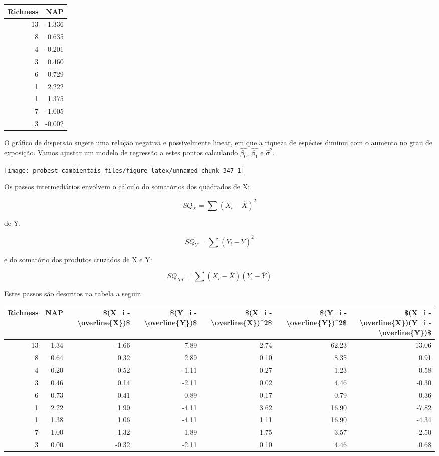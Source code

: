 \documentclass[
]{book}
\begin{document}
\begin{tabular}{r|r}
\hline
Richness & NAP\\
\hline
13 & -1.336\\
\hline
8 & 0.635\\
\hline
4 & -0.201\\
\hline
3 & 0.460\\
\hline
6 & 0.729\\
\hline
1 & 2.222\\
\hline
1 & 1.375\\
\hline
7 & -1.005\\
\hline
3 & -0.002\\
\hline
\end{tabular}

O gráfico de dispersão sugere uma relação negativa e possivelmente linear, em que a riqueza de espécies diminui com o aumento no grau de exposição. Vamos ajustar um modelo de regressão a estes pontos calculando \(\hat{\beta_0}\), \(\hat{\beta_1}\) e \(\hat{\sigma}^2\).

\begin{center}\texttt{[image: probest-cambientais\_files/figure-latex/unnamed-chunk-347-1]} \end{center}

Os passos intermediários envolvem o cálculo do somatórios dos quadrados de X:

\[SQ_X = \sum{(X_i - \overline{X})^2}\]

de Y:

\[SQ_Y = \sum{(Y_i - \overline{Y})^2}\]

e do somatório dos produtos cruzados de X e Y:

\[SQ_{XY} = \sum{(X_i - \overline{X}) (Y_i - \overline{Y})}\]

Estes passos são descritos na tabela a seguir.

\begin{tabular}{r|r|r|r|r|r|r}
\hline
Richness & NAP & \$(X\_i - \textbackslash{}overline\{X\})\$ & \$(Y\_i - \textbackslash{}overline\{Y\})\$ & \$(X\_i - \textbackslash{}overline\{X\})\textasciicircum{}2\$ & \$(Y\_i - \textbackslash{}overline\{Y\})\textasciicircum{}2\$ & \$(X\_i - \textbackslash{}overline\{X\})(Y\_i - \textbackslash{}overline\{Y\})\$\\
\hline
13 & -1.34 & -1.66 & 7.89 & 2.74 & 62.23 & -13.06\\
\hline
8 & 0.64 & 0.32 & 2.89 & 0.10 & 8.35 & 0.91\\
\hline
4 & -0.20 & -0.52 & -1.11 & 0.27 & 1.23 & 0.58\\
\hline
3 & 0.46 & 0.14 & -2.11 & 0.02 & 4.46 & -0.30\\
\hline
6 & 0.73 & 0.41 & 0.89 & 0.17 & 0.79 & 0.36\\
\hline
1 & 2.22 & 1.90 & -4.11 & 3.62 & 16.90 & -7.82\\
\hline
1 & 1.38 & 1.06 & -4.11 & 1.11 & 16.90 & -4.34\\
\hline
7 & -1.00 & -1.32 & 1.89 & 1.75 & 3.57 & -2.50\\
\hline
3 & 0.00 & -0.32 & -2.11 & 0.10 & 4.46 & 0.68\\
\hline
\end{tabular}
\end{document}
